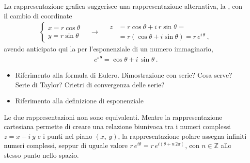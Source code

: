 \documentclass[letterpaper,10pt,english]{jupyterBook}
\begin{document}
\sphinxAtStartPar
La rappresentazione grafica suggerisce una rappresentazione alternativa, la , con il cambio di coordinate
\begin{equation*}
\begin{split}\begin{cases}
x = r \cos \theta \\
y = r \sin \theta
\end{cases} \quad \rightarrow \quad 
\begin{aligned}
z & = r \cos \theta + i \ r \sin \theta = \\
  & = r \left( \cos \theta + i \sin \theta \right) = r \, e^{i \, \theta} \ ,
\end{aligned}\end{split}
\end{equation*}
\sphinxAtStartPar
avendo anticipato qui la  per l’esponenziale di un numero immaginario,
\begin{equation*}
\begin{split}e^{i \, \theta} = \cos \theta + i \, \sin \theta \ .\end{split}
\end{equation*}
\sphinxAtStartPar
{}
\begin{itemize}
\item {} 
\sphinxAtStartPar
Riferimento alla formula di Eulero. Dimostrazione con serie? Cosa serve? Serie di Taylor? Crietri di convergenza delle serie?

\item {} 
\sphinxAtStartPar
Riferimento alla definizione di esponenziale

\end{itemize}

\sphinxAtStartPar
{} Le due rappresentazioni non sono equivalenti. Mentre la rappresentazione cartesiana permette di creare una relazione biunivoca tra i numeri complessi \(z = x + i \ y\) e i punti nel piano \((x, \ y)\), la rappresentazione polare assegna infiniti numeri complessi, seppur di uguale valore \(r \, e^{i \theta} = r \, e^{i (\theta + n \, 2 \pi)}\), con \(n \in \mathbb{Z}\) allo stesso punto nello spazio.
\end{document}
